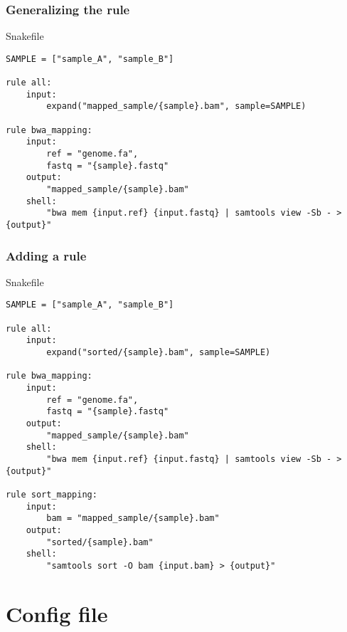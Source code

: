 \documentclass{beamer}
\begin{document}
\begin{frame}[fragile]
    \frametitle{Generalizing the rule}
    \begin{block}{Snakefile}
    \begin{lstlisting}
SAMPLE = ["sample_A", "sample_B"]

rule all:
    input:
        expand("mapped_sample/{sample}.bam", sample=SAMPLE)

rule bwa_mapping:
    input:
        ref = "genome.fa",
        fastq = "{sample}.fastq"
    output:
        "mapped_sample/{sample}.bam"
    shell:
        "bwa mem {input.ref} {input.fastq} | samtools view -Sb - > {output}"
    \end{lstlisting}
    \end{block}
\end{frame}

\begin{frame}[fragile]
    \frametitle{Adding a rule}
    \begin{block}{Snakefile}
    \begin{lstlisting}
SAMPLE = ["sample_A", "sample_B"]

rule all:
    input:
        expand("sorted/{sample}.bam", sample=SAMPLE)

rule bwa_mapping:
    input:
        ref = "genome.fa",
        fastq = "{sample}.fastq"
    output:
        "mapped_sample/{sample}.bam"
    shell:
        "bwa mem {input.ref} {input.fastq} | samtools view -Sb - > {output}"

rule sort_mapping:
    input:
        bam = "mapped_sample/{sample}.bam"
    output:
        "sorted/{sample}.bam"
    shell:
        "samtools sort -O bam {input.bam} > {output}"
    \end{lstlisting}
    \end{block}
\end{frame}

\section{Config file}
\end{document}
